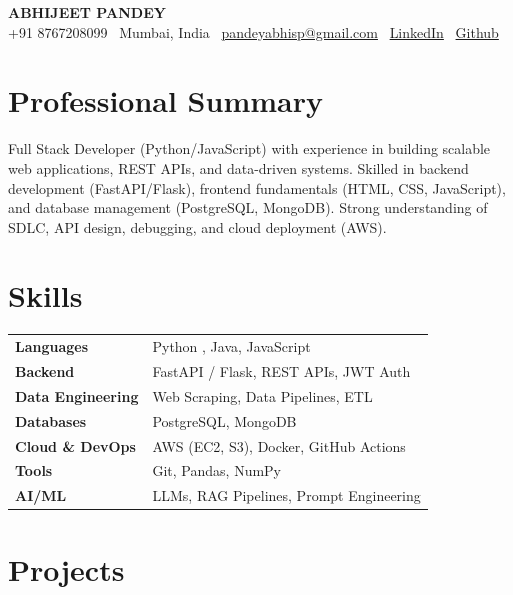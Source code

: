 \documentclass[10pt, a4paper]{article}
\begin{document}
\pagestyle{empty}

\begin{center}
  {\Huge\bfseries ABHIJEET PANDEY} \\[4pt]
  +91 8767208099 \textbar\ Mumbai, India \textbar\ \href{mailto:pandeyabhisp@gmail.com}{pandeyabhisp@gmail.com} \textbar\ \href{https://linkedin.com}{LinkedIn} \textbar\ \href{https://github.com}{Github}
\end{center}

\vspace{4pt}

\section{Professional Summary}

Full Stack Developer (Python/JavaScript) with experience in building scalable web applications, REST APIs, and data-driven systems. Skilled in backend development (FastAPI/Flask), frontend fundamentals (HTML, CSS, JavaScript), and database management (PostgreSQL, MongoDB). Strong understanding of SDLC, API design, debugging, and cloud deployment (AWS). 

\section{Skills}

\noindent
\begin{tabularx}{\textwidth}{@{}l X@{}}
  \textbf{Languages}        & Python , Java, JavaScript \\
  \textbf{Backend}          & FastAPI / Flask, REST APIs, JWT Auth \\
  \textbf{Data Engineering} & Web Scraping, Data Pipelines, ETL \\
  \textbf{Databases}        & PostgreSQL, MongoDB \\
  \textbf{Cloud \& DevOps}  & AWS (EC2, S3), Docker, GitHub Actions \\
  \textbf{Tools}            & Git, Pandas, NumPy \\
  \textbf{AI/ML}            & LLMs, RAG Pipelines, Prompt Engineering \\
\end{tabularx}

\section{Projects}
\end{document}
